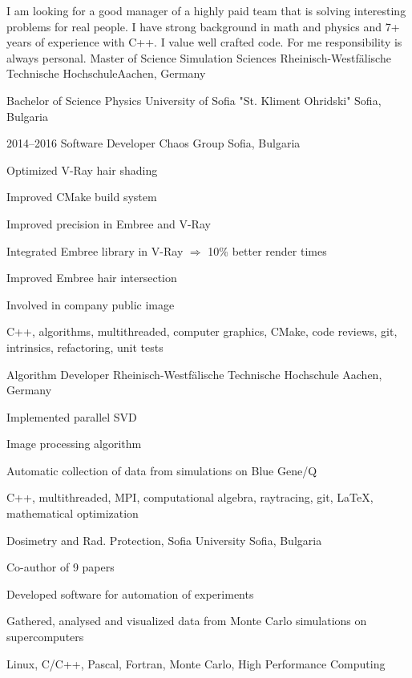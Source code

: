 I am looking for a good manager of a highly paid team that is solving
interesting problems for real people. I have strong background in math and
physics and 7+ years of experience with C++. I value well crafted code. For me
responsibility is always personal.
{Master of Science}
{Simulation Sciences}
{Rheinisch-Westfälische Technische Hochschule}{Aachen, Germany}

{Bachelor of Science}
{Physics}
{University of Sofia "St. Kliment Ohridski"}
{Sofia, Bulgaria}


\myjobb
{2014--2016}
{Software Developer}
{Chaos Group}
{Sofia, Bulgaria}
{
\item Optimized V-Ray hair shading
\item Improved CMake build system 
\item Improved precision in Embree and V-Ray
}
{
\item Integrated Embree library in V-Ray $\Rightarrow$ 10\% better render times 
\item Improved Embree hair intersection 
\item Involved in company public image
}
{C++, algorithms, multithreaded, computer graphics, CMake, code reviews, git, intrinsics, refactoring, unit tests}

{Algorithm Developer}
{Rheinisch-Westfälische Technische Hochschule}
{Aachen, Germany}
{
 \item Implemented parallel SVD
 \item Image processing algorithm
}
{
\item Automatic collection of data from simulations on Blue Gene/Q
}
{C++, multithreaded, MPI, computational algebra, raytracing, git, \LaTeX, mathematical optimization}

{Dosimetry and Rad. Protection, Sofia University} {Sofia, Bulgaria}
{
 \item Co-author of 9 papers
 \item Developed software for automation of experiments
}
{ 
 \item Gathered, analysed and visualized data from Monte Carlo simulations on supercomputers
}
{Linux, C/C++, Pascal, Fortran, Monte Carlo, High Performance Computing}
